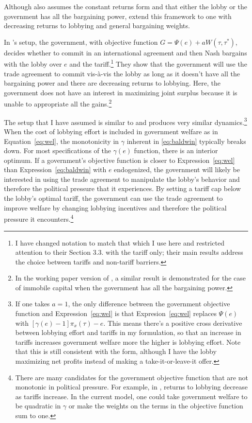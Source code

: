 \documentclass[12pt]{article}
\newcommand{\ga}{\gamma}
\begin{document}
Although \Textcite{mrc2007} also assumes the constant returns form and that either the lobby or the government has all the bargaining power, \Textcite{lt} extend this framework to one with decreasing returns to lobbying and general bargaining weights.

In \Textcite{lt}'s setup, the government, with objective function $G = \Psi(e) + aW(\tau,\tau^*)$, decides whether to commit in an international agreement and then Nash bargains with the lobby over $e$ and the tariff.\footnote{I have changed notation to match that which I use here and restricted attention to their Section 3.3. with the tariff only; their main results address the choice between tariffs and non-tariff barriers.} They show that the government will use the trade agreement to commit vis-\`{a}-vis the lobby as long as it doesn't have all the bargaining power and there are decreasing returns to lobbying. Here, the government does not have an interest in maximizing joint surplus because it is unable to appropriate all the gains.\footnote{In the working paper version of \Textcite{mrc2007}, a similar result is demonstrated for the case of immobile capital when the government has all the bargaining power.}

The setup that I have assumed is similar to \Textcite{lt} and produces very similar dynamics.\footnote{If one takes $a=1$, the only difference between the \Textcite{lt} government objective function and Expression~\ref{eq:wel} is that Expresion~\ref{eq:wel} replaces $\Psi(e)$ with $[\ga(e) - 1]\pi_x(\tau) - e$. This means there's a positive cross derivative between lobbying effort and tariffs in my formulation, so that an increase in tariffs increases government welfare more the higher is lobbying effort. Note that this is still consistent with the \Textcite{dgh97} form, although I have the lobby maximizing net profits instead of making a take-it-or-leave-it offer. } When the cost of lobbying effort is included in government welfare as in Equation~\ref{eq:wel}, the monotonicity in $\ga$ inherent in \ref{eq:baldwin} typically breaks down. For most specifications of the $\ga(e)$ function, there is an interior optimum. If a government's objective function is closer to Expression~\ref{eq:wel} than Expression~\ref{eq:baldwin} with $e$ endogenized, the government will likely be interested in using the trade agreement to manipulate the lobby's behavior and therefore the political pressure that it experiences. By setting a tariff cap below the lobby's optimal tariff, the government can use the trade agreement to improve welfare by changing lobbying incentives and therefore the political pressure it encounters.\footnote{There are many candidates for the government objective function that are not monotonic in political pressure. For example, in \Textcite{ethier2012}, returns to lobbying decrease as tariffs increase. In the current model, one could take government welfare to be quadratic in $\ga$ or make the weights on the terms in the objective function sum to one.}
\end{document}
